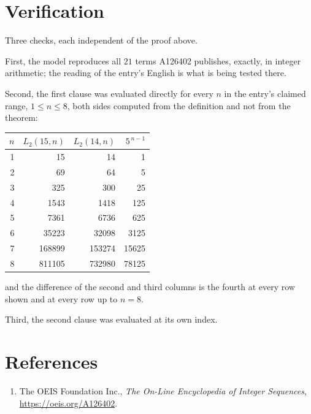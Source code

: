 \documentclass[11pt,a4paper]{article}
\theoremstyle{plain}
\theoremstyle{definition}
\begin{document}
\section{Verification}

Three checks, each independent of the proof above.

First, the model reproduces all $21$ terms A126402 publishes, exactly, in integer
arithmetic; the reading of the entry's English is what is being tested there.

Second, the first clause was evaluated directly for every $n$ in the entry's claimed range,
$1\le n\le8$, both sides computed from the definition and not from the theorem:

\begin{center}
\begin{tabular}{rrrr}
$n$ & $L_{2}(15,n)$ & $L_{2}(14,n)$ & $5^{\,n-1}$ \\ \hline
1 & 15 & 14 & 1 \\
2 & 69 & 64 & 5 \\
3 & 325 & 300 & 25 \\
4 & 1543 & 1418 & 125 \\
5 & 7361 & 6736 & 625 \\
6 & 35223 & 32098 & 3125 \\
7 & 168899 & 153274 & 15625 \\
8 & 811105 & 732980 & 78125 \\
\end{tabular}
\end{center}

\noindent and the difference of the second and third columns is the fourth at every row shown
and at every row up to $n=8$.

Third, the second clause was evaluated at its own index.

\section*{References}
\begin{enumerate}
\item The OEIS Foundation Inc., \emph{The On-Line Encyclopedia of Integer Sequences},
\url{https://oeis.org/A126402}.
\end{enumerate}
\end{document}
